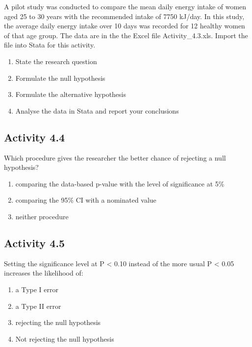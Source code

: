 \documentclass[
]{memoir}
\providecommand{\tightlist}{%
  \setlength{\itemsep}{0pt}\setlength{\parskip}{0pt}}
\begin{document}
A pilot study was conducted to compare the mean daily energy intake of women aged 25 to 30 years with the recommended intake of 7750 kJ/day. In this study, the average daily energy intake over 10 days was recorded for 12 healthy women of that age group. The data are in the the Excel file Activity\_4.3.xls. Import the file into Stata for this activity.

\begin{enumerate}
\def\labelenumi{\alph{enumi})}
\tightlist
\item
  State the research question
\item
  Formulate the null hypothesis
\item
  Formulate the alternative hypothesis
\item
  Analyse the data in Stata and report your conclusions
\end{enumerate}

\hypertarget{activity-4.4}{%
\subsection{Activity 4.4}\label{activity-4.4}}

Which procedure gives the researcher the better chance of rejecting a null hypothesis?

\begin{enumerate}
\def\labelenumi{\alph{enumi})}
\tightlist
\item
  comparing the data-based p-value with the level of significance at 5\%
\item
  comparing the 95\% CI with a nominated value
\item
  neither procedure
\end{enumerate}

\hypertarget{activity-4.5}{%
\subsection{Activity 4.5}\label{activity-4.5}}

Setting the significance level at P \textless{} 0.10 instead of the more usual P \textless{} 0.05 increases the likelihood of:

\begin{enumerate}
\def\labelenumi{\alph{enumi})}
\tightlist
\item
  a Type I error
\item
  a Type II error
\item
  rejecting the null hypothesis
\item
  Not rejecting the null hypothesis
\end{enumerate}
\end{document}

